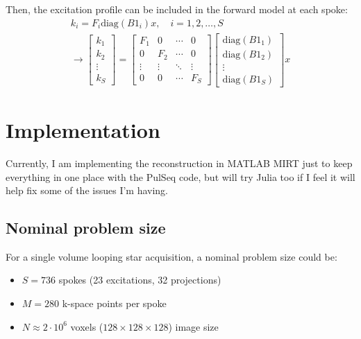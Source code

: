 \documentclass[11pt]{article}
\begin{document}
Then, the excitation profile can be included in the forward model at each spoke:
\begin{equation}\label{eq:expro_fwd}
  \begin{aligned}
    k_{i} = F_{i} \text{diag}(B1_i) x, \quad i = 1, 2, \ldots, S \\
    \rightarrow \begin{bmatrix} k_1 \\ k_2 \\ \vdots \\ k_S \end{bmatrix}
    = \begin{bmatrix} F_{1} & 0 & \cdots & 0 \\ 0 & F_{2} & \cdots & 0 \\ \vdots & \vdots & \ddots & \vdots \\ 0 & 0 & \cdots & F_{S} \end{bmatrix}
      \begin{bmatrix} \text{diag}(B1_1) \\ \text{diag}(B1_2) \\ \vdots \\ \text{diag}(B1_S) \end{bmatrix} x
  \end{aligned}
\end{equation}

\section*{Implementation}
Currently, I am implementing the reconstruction in MATLAB MIRT just to keep everything in one place with the PulSeq code,
but will try Julia too if I feel it will help fix some of the issues I'm having.

\subsection*{Nominal problem size}
For a single volume looping star acquisition, a nominal problem size could be:
\begin{itemize}
  \item $S = 736$ spokes (23 excitations, 32 projections)
  \item $M = 280$ k-space points per spoke
  \item $N \approx 2\cdot10^6$ voxels ($128 \times 128 \times 128$) image size
\end{itemize}
\end{document}
